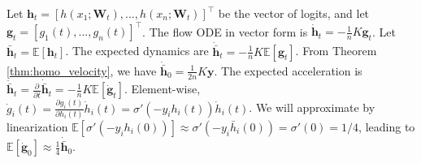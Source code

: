 \documentclass[letter,11pt]{article}
\begin{document}
Let $\mathbf{h}_t = [h(x_1; \mathbf{W}_t), ..., h(x_n; \mathbf{W}_t)]^\top$ be the vector of logits, and let $\mathbf{g}_t = [g_1(t), ..., g_n(t)]^\top$. The flow ODE in vector form is $\dot{\mathbf{h}}_t = -\frac{1}{n} K \mathbf{g}_t$. Let $\bar{\mathbf{h}}_t = \mathbb{E}[\mathbf{h}_t]$.
    The expected dynamics are $\dot{\bar{\mathbf{h}}}_t = -\frac{1}{n} K \mathbb{E}[\mathbf{g}_t]$.
    From Theorem \ref{thm:homo_velocity}, we have $\dot{\bar{\mathbf{h}}}_0 = \frac{1}{2n} K \mathbf{y}$.
    The expected acceleration is $\ddot{\bar{\mathbf{h}}}_t = \frac{\partial}{\partial t} \dot{\bar{\mathbf{h}}}_t = -\frac{1}{n} K \mathbb{E}[\dot{\mathbf{g}}_t]$.
    Element-wise, $\dot{g}_i(t) = \frac{\partial g_i(t)}{\partial h_i(t)} \dot{h}_i(t) = \sigma'(-y_i h_i(t)) \dot{h}_i(t)$.
    We will approximate by linearization $\mathbb{E}[\sigma'(-y_i h_i(0))] \approx \sigma'(-y_i \bar{h}_i(0)) = \sigma'(0) = 1/4$, leading to $\mathbb{E}[\dot{\mathbf{g}}_0] \approx \frac{1}{4} \dot{\bar{\mathbf{h}}}_0$.
    
\end{document}
